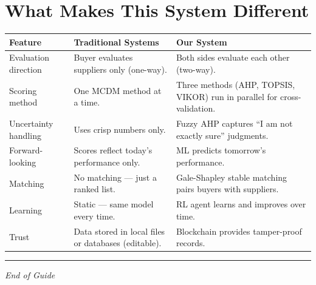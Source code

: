 \documentclass[11pt]{article}
\begin{document}
\section{What Makes This System Different}

\begin{center}
\begin{tabularx}{\textwidth}{>{\raggedright\arraybackslash}p{3.5cm} >{\raggedright\arraybackslash}X >{\raggedright\arraybackslash}X}
\toprule
\textbf{Feature} & \textbf{Traditional Systems} & \textbf{Our System} \\
\midrule
Evaluation direction & Buyer evaluates suppliers only (one-way). & Both sides evaluate each other (two-way). \\
\addlinespace
Scoring method & One MCDM method at a time. & Three methods (AHP, TOPSIS, VIKOR) run in parallel for cross-validation. \\
\addlinespace
Uncertainty handling & Uses crisp numbers only. & Fuzzy AHP captures ``I am not exactly sure'' judgments. \\
\addlinespace
Forward-looking & Scores reflect today's performance only. & ML predicts tomorrow's performance. \\
\addlinespace
Matching & No matching --- just a ranked list. & Gale-Shapley stable matching pairs buyers with suppliers. \\
\addlinespace
Learning & Static --- same model every time. & RL agent learns and improves over time. \\
\addlinespace
Trust & Data stored in local files or databases (editable). & Blockchain provides tamper-proof records. \\
\bottomrule
\end{tabularx}
\end{center}

\vspace{1cm}
\begin{center}
\rule{0.6\textwidth}{0.4pt}
\par\vspace{0.3cm}
{\itshape End of Guide}
\end{center}
\end{document}
